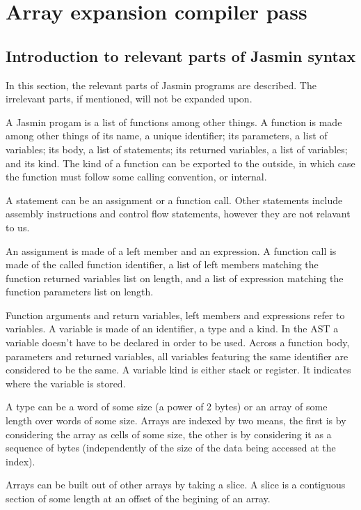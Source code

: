 \documentclass{article}
\begin{document}
\section{Array expansion compiler pass}\label{sec:syntax}

\subsection{Introduction to relevant parts of Jasmin syntax}

In this section, the relevant parts of Jasmin programs are described. The
irrelevant parts, if mentioned, will not be expanded upon.

A Jasmin progam is a list of functions among other things. A function is made
among other things of its name, a unique identifier; its parameters, a list of
variables; its body, a list of statements; its returned variables, a list of
variables; and its kind. The kind of a function can be exported to the outside,
in which case the function must follow some calling convention, or internal.

\smallskip

A statement can be an assignment or a function call.
Other statements include assembly instructions and control flow statements,
however they are not relavant to us.

An assignment is made of a left member and an expression. A function call is
made of the called function identifier, a list of left members matching the
function returned variables list on length, and a list of expression matching
the function parameters list on length.

Function arguments and return variables, left members and expressions refer to
variables. A variable is made of an identifier, a type and a kind. In the AST a
variable doesn't have to be declared in order to be used. Across a function
body, parameters and returned variables, all variables featuring the same
identifier are considered to be the same. A variable kind is either stack or
register. It indicates where the variable is stored.

\smallskip

A type can be a word of some size (a power of 2 bytes) or an array of some
length over words of some size. Arrays are indexed by two means, the first is
by considering the array as cells of some size, the other is by considering it
as a sequence of bytes (independently of the size of the data being accessed at
the index).

Arrays can be built out of other arrays by taking a slice. A slice is a
contiguous section of some length at an offset of the begining of an array.
\end{document}
